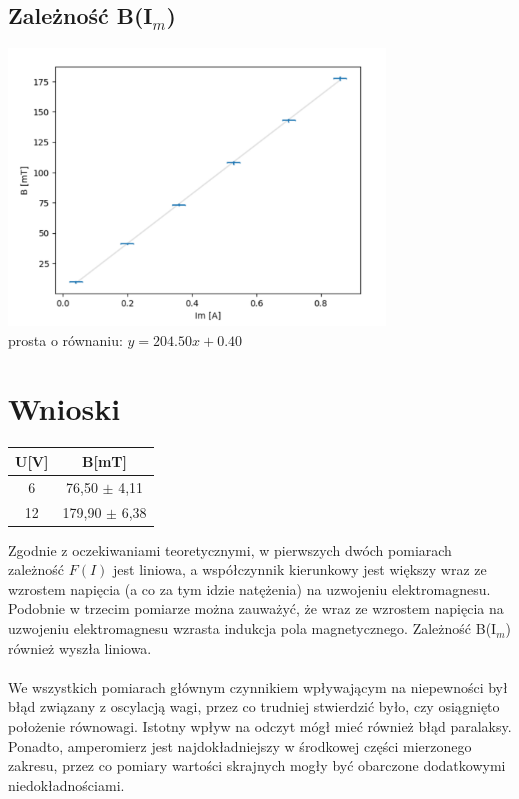 \documentclass{article}
\begin{document}
\subsection{Zależność B(I$_m$)}
\includegraphics[width=10cm]{JEBACDISA123}
\\
prosta o równaniu: $y = 204.50x + 0.40$


\section{Wnioski}

\begin{center}
\begin{tabular}{c | c}
U[V] & B[mT] \\
\hline
6 & 76,50 $\pm$ 4,11 \\
12 & 179,90 $\pm$ 6,38
\end{tabular}
\end{center}
Zgodnie z oczekiwaniami teoretycznymi,  w pierwszych dwóch pomiarach zależność $F(I)$ jest liniowa, 
a współczynnik kierunkowy jest większy wraz ze wzrostem napięcia (a co za tym idzie natężenia) na uzwojeniu elektromagnesu.
Podobnie w trzecim pomiarze można zauważyć, że wraz ze wzrostem napięcia na uzwojeniu elektromagnesu wzrasta indukcja pola magnetycznego. 
Zależność B(I$_m$) również wyszła liniowa.\\\\
We wszystkich pomiarach głównym czynnikiem wpływającym na niepewności był błąd związany z oscylacją wagi, przez co trudniej stwierdzić było, czy osiągnięto położenie równowagi.
Istotny wpływ na odczyt mógł mieć również błąd paralaksy. Ponadto, amperomierz jest najdokładniejszy w środkowej części mierzonego zakresu, przez co pomiary 
wartości skrajnych mogły być obarczone dodatkowymi niedokładnościami.
\end{document}

